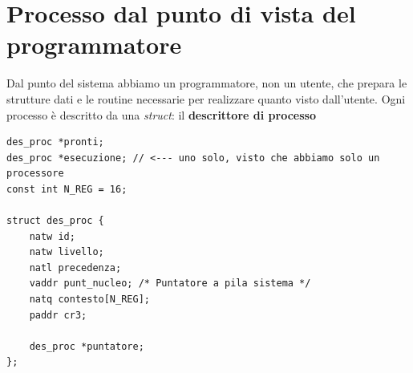 \documentclass[11pt]{report}
\theoremstyle{definition}
\begin{document}
\section{Processo dal punto di vista del programmatore}
Dal punto del sistema abbiamo un programmatore, non un utente, che prepara le strutture dati e le routine necessarie per realizzare quanto visto dall'utente. Ogni processo è descritto da una \emph{struct}: il \textbf{descrittore di processo}
\begin{verbatim}
des_proc *pronti;
des_proc *esecuzione; // <--- uno solo, visto che abbiamo solo un processore
const int N_REG = 16;

struct des_proc {
    natw id;
    natw livello;
    natl precedenza;
    vaddr punt_nucleo; /* Puntatore a pila sistema */
    natq contesto[N_REG];
    paddr cr3;
    
    des_proc *puntatore;
};
\end{verbatim}
\end{document}

